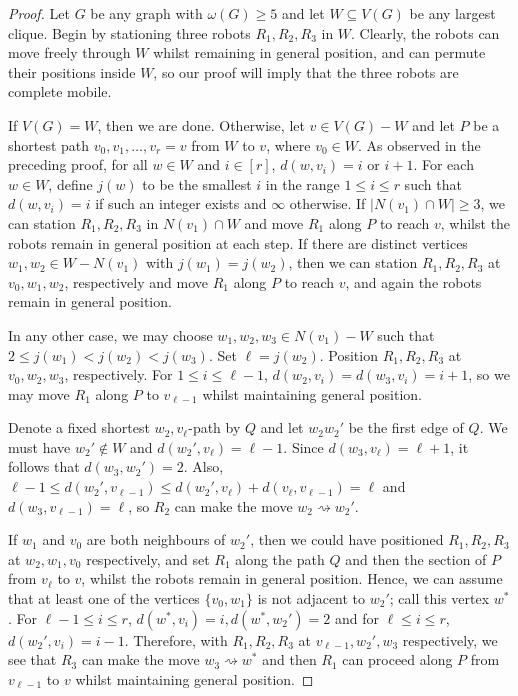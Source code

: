 \documentclass[a4paper,12pt]{article}
\theoremstyle{definition}
\newcommand{\move}{\rightsquigarrow}
\begin{document}
	\begin{proof}
		Let $G$ be any graph with $\omega(G) \geq 5$ and let $W \subseteq V(G)$ be any largest clique. Begin by stationing three robots $R_1, R_2, R_3$ in $W$. Clearly, the robots can move freely through $W$ whilst remaining in general position, and can permute their positions inside $W$, so our proof will imply that the three robots are complete mobile. 
		
		If $V(G) = W$, then we are done. Otherwise, let $v \in V(G) - W$ and let $P$ be a shortest path $v_0,v_1, \dots, v_r = v$ from $W$ to $v$, where $v_0 \in W$. As observed in the preceding proof, for all $w \in W$ and $i \in [r]$, $d(w,v_i) = i$ or $i+1$. For each $w \in W$, define $j(w)$ to be the smallest $i$ in the range $1 \leq i \leq r$ such that $d(w, v_i) = i$ if such an integer exists and $\infty$ otherwise. If $|N(v_1) \cap W| \geq 3$, we can station $R_1, R_2, R_3$ in $N(v_1) \cap W$ and move $R_1$ along $P$ to reach $v$, whilst the robots remain in general position at each step. If there are distinct vertices $w_1,w_2 \in W-N(v_1)$ with $j(w_1) = j(w_2)$, then we can station $R_1, R_2, R_3$ at $v_0,w_1,w_2$, respectively and move $R_1$ along $P$ to reach $v$, and again the robots remain in general position.
		
		In any other case, we may choose $w_1,w_2,w_3 \in N(v_1)-W$ such that $2 \leq j(w_1) < j(w_2) < j(w_3)$. Set $\ell = j(w_2)$.  Position $R_1, R_2, R_3$ at $v_0,w_2,w_3$, respectively. For $1 \leq i \leq \ell-1$, $d(w_2,v_i) = d(w_3, v_i) = i+1$, so we may move $R_1$ along $P$ to $v_{\ell -1}$ whilst maintaining general position. 
		
		Denote a fixed shortest $w_2,v_{\ell }$-path by $Q$ and let $w_2w_2'$ be the first edge of $Q$. We must have $w_2' \not \in W$ and $d(w_2',v_{\ell }) = \ell - 1$. Since $d(w_3, v_\ell) = \ell + 1$, it follows that $d(w_3,w_2') = 2$. Also, $\ell - 1 \leq d(w_2', v_{\ell -1}) \leq d(w_2', v_\ell) + d(v_\ell, v_{\ell -1}) = \ell $ and $d(w_3, v_{\ell -1}) = \ell$, so $R_2$ can make the move $w_2 \move w_2'$. 
		
		If $w_1$ and $v_0$ are both neighbours of $w_2'$, then we could have positioned $R_1,R_2,R_3$ at $w_2,w_1,v_0$ respectively, and set $R_1$ along the path $Q$ and then the section of $P$ from $v_{\ell }$ to $v$, whilst the robots remain in general position. Hence, we can assume that at least one of the vertices $\{ v_0,w_1\} $ is not adjacent to $w_2'$; call this vertex $w^*$. For $\ell-1 \leq i \leq r$, $d(w^*,v_i) = i, d(w^*,w_2') = 2$ and for $\ell \leq i \leq r$, $d(w_2', v_i) = i-1$. Therefore, with $R_1,R_2,R_3$ at $v_{\ell -1},w_2',w_3$ respectively, we see that $R_3$ can make the move $w_3 \move w^*$ and then $R_1$ can proceed along $P$ from $v_{\ell -1}$ to $v$ whilst maintaining general position.
	\end{proof}
	
\end{document}
